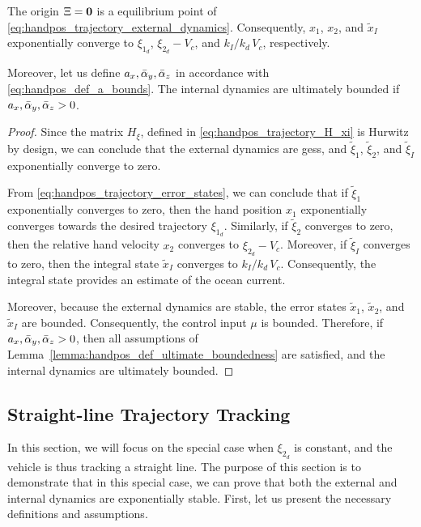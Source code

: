 \begin{prop}
    \label{prop:handpos_trajectory_trajectory_tracking}
    The origin $\Xi = \mathbf{0}$ is a  equilibrium point of \eqref{eq:handpos_trajectory_external_dynamics}.
    Consequently, $x_1$, $x_2$, and $\tilde{x}_I$ exponentially converge to $\xi_{1_d}$, $\xi_{2_d} - V_c$, and $k_I/k_d\,V_c$, respectively.

    Moreover, let us define $a_x, \Bar{\alpha}_y, \Bar{\alpha}_z$ in accordance with \eqref{eq:handpos_def_a_bounds}.
    The internal dynamics are ultimately bounded if $a_x, \Bar{\alpha}_y, \Bar{\alpha}_z > 0$.
\end{prop}
\begin{proof}
    Since the matrix $H_{\xi}$, defined in \eqref{eq:handpos_trajectory_H_xi} is Hurwitz by design, we can conclude that the external dynamics are \glspl{ges}, and $\tilde{\xi}_1$, $\tilde{\xi}_2$, and $\tilde{\xi}_I$ exponentially converge to zero.

    From \eqref{eq:handpos_trajectory_error_states}, we can conclude that if $\tilde{\xi}_1$ exponentially converges to zero, then the hand position $x_1$ exponentially converges towards the desired trajectory $\xi_{1_d}$.
    Similarly, if $\tilde{\xi}_2$ converges to zero, then the relative hand velocity $x_2$ converges to $\xi_{2_d} - V_c$.
    Moreover, if $\tilde{\xi}_I$ converges to zero, then the integral state $\tilde{x}_I$ converges to $k_I/k_d\,V_c$.
    Consequently, the integral state provides an estimate of the ocean current.

    Moreover, because the external dynamics are stable, the error states $\tilde{x}_1$, $\tilde{x}_2$, and $\tilde{x}_I$ are bounded.
    Consequently, the control input $\mu$ is bounded.
    Therefore, if $a_x, \Bar{\alpha}_y, \Bar{\alpha}_z > 0$, then all assumptions of Lemma~\ref{lemma:handpos_def_ultimate_boundedness} are satisfied, and the internal dynamics are ultimately bounded.
\end{proof}

\subsection{Straight-line Trajectory Tracking}
\label{sec:handpos_trajectory_straight_line_trajectory}
In this section, we will focus on the special case when $\xi_{2_d}$ is constant, and the vehicle is thus tracking a straight line.
The purpose of this section is to demonstrate that in this special case, we can prove that both the external and internal dynamics are exponentially stable.
First, let us present the necessary definitions and assumptions.

